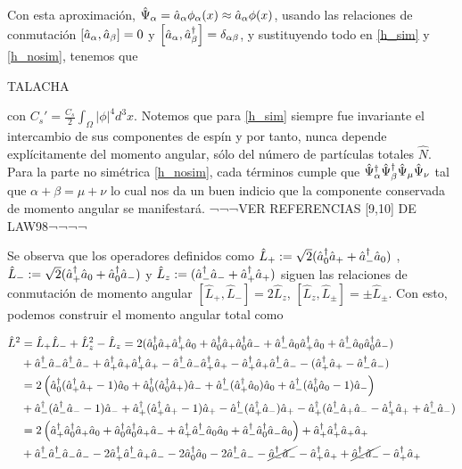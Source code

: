 
Con esta aproximación, $\hat{\Psi}_{\alpha} = \hat{a}_{\alpha} \phi_\alpha(x) \approx \hat{a}_{\alpha} \phi(x)$, usando las relaciones de conmutación $\left[\hat{a}_{\alpha},\hat{a}_{\beta}\right] = 0$ y $\left[\hat{a}_{\alpha},\hat{a}_{\beta}^{\dagger}\right] = \delta_{\alpha\beta}$, y sustituyendo todo en \ref{h_sim} y \ref{h_nosim}, tenemos que

TALACHA

con $C_s' = \frac{C_s}{2}\int_{\Omega}|\phi|^4d^3x$. Notemos que para \ref{h_sim} siempre fue invariante el intercambio de sus componentes de espín y por tanto, nunca depende explícitamente del momento angular, sólo del número de partículas totales $\hat{N}$. Para la parte no simétrica \ref{h_nosim}, cada términos cumple que $\hat{\Psi}^{\dagger}_\alpha\hat{\Psi}^{\dagger}_\beta\hat{\Psi}_{\mu}\hat{\Psi}_{\nu}$ tal que $\alpha + \beta = \mu + \nu$ lo cual nos da un buen indicio que la componente conservada de momento angular se manifestará. ¬¬¬VER REFERENCIAS [9,10] DE LAW98¬¬¬¬

Se observa que los operadores definidos como $\hat{L}_+ := \sqrt{2}( \hat{a}_{0}^{\dagger}\hat{a}_{+} + \hat{a}_{-}^{\dagger}\hat{a}_{0})$ , $\hat{L}_- := \sqrt{2}( \hat{a}_{+}^{\dagger}\hat{a}_{0} + \hat{a}_{0}^{\dagger}\hat{a}_{-})$ y $\hat{L}_z := ( \hat{a}_{-}^{\dagger}\hat{a}_{-} + \hat{a}_{+}^{\dagger}\hat{a}_{+})$ siguen las relaciones de conmutación de momento angular $\left[ \hat{L}_+, \hat{L}_- \right] = 2\hat{L}_z$, $\left[ \hat{L}_z, \hat{L}_\pm \right] = \pm \hat{L}_\pm$.
Con esto, podemos construir el momento angular total como 

\begin{equation*}
\begin{split}
\hat{L}^2 & = \hat{L}_+\hat{L}_- + \hat{L}_z^2 - \hat{L}_z = 2(  \hat{a}_{0}^{\dagger}\hat{a}_{+}\hat{a}_{+}^{\dagger}\hat{a}_{0} + \hat{a}_{0}^{\dagger}\hat{a}_{+}\hat{a}_{0}^{\dagger}\hat{a}_{-} + \hat{a}_{-}^{\dagger}\hat{a}_{0}\hat{a}_{+}^{\dagger}\hat{a}_{0} + \hat{a}_{-}^{\dagger}\hat{a}_{0}\hat{a}_{0}^{\dagger}\hat{a}_{-}) \\
& + \hat{a}_{-}^{\dagger}\hat{a}_{-}\hat{a}_{-}^{\dagger}\hat{a}_{-} + \hat{a}_{+}^{\dagger}\hat{a}_{+}\hat{a}_{+}^{\dagger}\hat{a}_{+} - \hat{a}_{-}^{\dagger}\hat{a}_{-}\hat{a}_{+}^{\dagger}\hat{a}_{+} - \hat{a}_{+}^{\dagger}\hat{a}_{+}\hat{a}_{-}^{\dagger}\hat{a}_{-} -(\hat{a}_{+}^{\dagger}\hat{a}_{+} -\hat{a}_{-}^{\dagger}\hat{a}_{-}) \\
& = 2\left(  \hat{a}_{0}^{\dagger}(\hat{a}_{+}^{\dagger}\hat{a}_{+}-1)\hat{a}_{0} + \hat{a}_{0}^{\dagger}(\hat{a}_{0}^{\dagger}\hat{a}_{+})\hat{a}_{-} + \hat{a}_{-}^{\dagger}(\hat{a}_{+}^{\dagger}\hat{a}_{0})\hat{a}_{0} + \hat{a}_{-}^{\dagger}(\hat{a}_{0}^{\dagger}\hat{a}_{0}-1)\hat{a}_{-}\right) \\
& + \hat{a}_{-}^{\dagger}(\hat{a}_{-}^{\dagger}\hat{a}_{-}-1)\hat{a}_{-} + \hat{a}_{+}^{\dagger}(\hat{a}_{+}^{\dagger}\hat{a}_{+}-1)\hat{a}_{+} - \hat{a}_{-}^{\dagger}(\hat{a}_{+}^{\dagger}\hat{a}_{-})\hat{a}_{+} - \hat{a}_{+}^{\dagger}(\hat{a}_{-}^{\dagger}\hat{a}_{+}\hat{a}_{-} -\hat{a}_{+}^{\dagger}\hat{a}_{+} + \hat{a}_{-}^{\dagger}\hat{a}_{-}) \\
& = 2\left( \hat{a}_{+}^{\dagger}\hat{a}_{0}^{\dagger}\hat{a}_{+}\hat{a}_{0} + \hat{a}_{0}^{\dagger}\hat{a}_{0}^{\dagger}\hat{a}_{+}\hat{a}_{-} +\hat{a}_{+}^{\dagger}\hat{a}_{-}^{\dagger}\hat{a}_{0}\hat{a}_{0} + \hat{a}_{-}^{\dagger}\hat{a}_{0}^{\dagger}\hat{a}_{-}\hat{a}_{0}\right) + \hat{a}_{+}^{\dagger}\hat{a}_{+}^{\dagger}\hat{a}_{+}\hat{a}_{+} \\
& + \hat{a}_{-}^{\dagger}\hat{a}_{-}^{\dagger}\hat{a}_{-}\hat{a}_{-} -2 \hat{a}_{+}^{\dagger}\hat{a}_{-}^{\dagger}\hat{a}_{+}\hat{a}_{-} - 2\hat{a}_{0}^{\dagger}\hat{a}_{0} -2\hat{a}_{-}^{\dagger}\hat{a}_{-} -\cancel{\hat{a}_{-}^{\dagger}\hat{a}_{-}} -\hat{a}_{+}^{\dagger}\hat{a}_{+} +\cancel{\hat{a}_{-}^{\dagger}\hat{a}_{-}} -\hat{a}_{+}^{\dagger}\hat{a}_{+}
\end{split}
\end{equation*}

